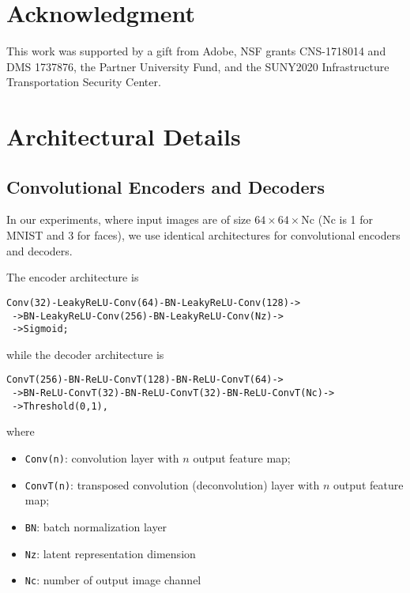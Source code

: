 \documentclass[runningheads]{llncs}
\begin{document}
\section{Acknowledgment}

This work was supported by a gift from Adobe, NSF grants CNS-1718014 and DMS 1737876, the Partner University Fund, and the SUNY2020 Infrastructure Transportation Security Center.




\clearpage




\appendix
\section{Architectural Details}
\label{append:architecture}
\subsection{Convolutional Encoders and Decoders}
\label{sec:convnet}
In our experiments, where input images are of size $64 \times 64 \times \text{Nc}$ (Nc is 1 for MNIST and 3 for faces), we use identical architectures for convolutional encoders and decoders.

The encoder architecture is
\begin{verbatim}
Conv(32)-LeakyReLU-Conv(64)-BN-LeakyReLU-Conv(128)->
 ->BN-LeakyReLU-Conv(256)-BN-LeakyReLU-Conv(Nz)->
 ->Sigmoid;
\end{verbatim}
while the decoder architecture is
\begin{verbatim}
ConvT(256)-BN-ReLU-ConvT(128)-BN-ReLU-ConvT(64)->
 ->BN-ReLU-ConvT(32)-BN-ReLU-ConvT(32)-BN-ReLU-ConvT(Nc)->
 ->Threshold(0,1),
\end{verbatim}

where
\begin{itemize}
	\item \texttt{Conv(n)}: convolution layer with $n$ output feature map;
	\item \texttt{ConvT(n)}: transposed convolution (deconvolution) layer with $n$ output feature map;
	\item \texttt{BN}: batch normalization layer
	\item \texttt{Nz}: latent representation dimension
	\item \texttt{Nc}: number of output image channel
\end{itemize}
\end{document}
